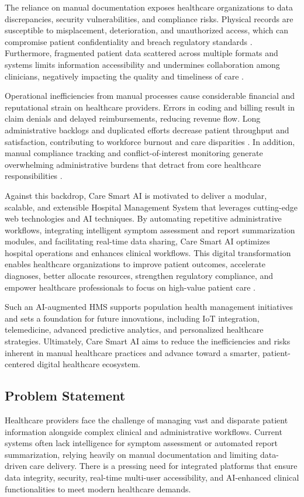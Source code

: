 \documentclass[conference]{IEEEtran}
\begin{document}
The reliance on manual documentation exposes healthcare organizations to data discrepancies, security vulnerabilities, and compliance risks. Physical records are susceptible to misplacement, deterioration, and unauthorized access, which can compromise patient confidentiality and breach regulatory standards \cite{web:57}. Furthermore, fragmented patient data scattered across multiple formats and systems limits information accessibility and undermines collaboration among clinicians, negatively impacting the quality and timeliness of care \cite{web:31}.

Operational inefficiencies from manual processes cause considerable financial and reputational strain on healthcare providers. Errors in coding and billing result in claim denials and delayed reimbursements, reducing revenue flow. Long administrative backlogs and duplicated efforts decrease patient throughput and satisfaction, contributing to workforce burnout and care disparities \cite{web:34,web:36,web:60}. In addition, manual compliance tracking and conflict-of-interest monitoring generate overwhelming administrative burdens that detract from core healthcare responsibilities \cite{web:57}.

Against this backdrop, Care Smart AI is motivated to deliver a modular, scalable, and extensible Hospital Management System that leverages cutting-edge web technologies and AI techniques. By automating repetitive administrative workflows, integrating intelligent symptom assessment and report summarization modules, and facilitating real-time data sharing, Care Smart AI optimizes hospital operations and enhances clinical workflows. This digital transformation enables healthcare organizations to improve patient outcomes, accelerate diagnoses, better allocate resources, strengthen regulatory compliance, and empower healthcare professionals to focus on high-value patient care \cite{web:18,web:20}.

Such an AI-augmented HMS supports population health management initiatives and sets a foundation for future innovations, including IoT integration, telemedicine, advanced predictive analytics, and personalized healthcare strategies. Ultimately, Care Smart AI aims to reduce the inefficiencies and risks inherent in manual healthcare practices and advance toward a smarter, patient-centered digital healthcare ecosystem.



\subsection{Problem Statement}
Healthcare providers face the challenge of managing vast and disparate patient information alongside complex clinical and administrative workflows. Current systems often lack intelligence for symptom assessment or automated report summarization, relying heavily on manual documentation and limiting data-driven care delivery. There is a pressing need for integrated platforms that ensure data integrity, security, real-time multi-user accessibility, and AI-enhanced clinical functionalities to meet modern healthcare demands.
\end{document}
